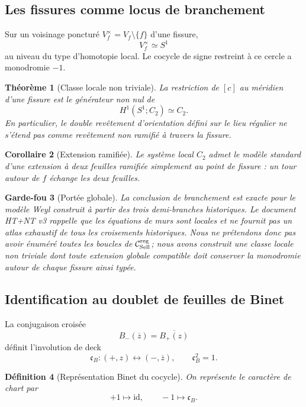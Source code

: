 \documentclass[11pt,a4paper]{article}
\newtheorem{theorem}{Théorème}[section]
\newtheorem{corollary}[theorem]{Corollaire}
\newtheorem{definition}[theorem]{Définition}
\newtheorem{guardrail}[theorem]{Garde-fou}
\begin{document}
\subsection{Les fissures comme locus de branchement}

Sur un voisinage poncturé $V_f^\times=V_f\setminus\{f\}$ d'une fissure,
\[
 V_f^\times\simeq S^1
\]
au niveau du type d'homotopie local. Le cocycle de signe restreint à ce cercle a monodromie $-1$.

\begin{theorem}[Classe locale non triviale]\label{thm:v16-local-H1}
La restriction de $[c]$ au méridien d'une fissure est le générateur non nul de
\[
 H^1(S^1;C_2)\simeq C_2.
\]
En particulier, le double revêtement d'orientation défini sur le lieu régulier ne s'étend pas comme revêtement non ramifié à travers la fissure.
\end{theorem}

\begin{corollary}[Extension ramifiée]\label{cor:v16-branched-cover}
Le système local $C_2$ admet le modèle standard d'une extension à deux feuilles ramifiée simplement au point de fissure : un tour autour de $f$ échange les deux feuilles.
\end{corollary}

\begin{guardrail}[Portée globale]
La conclusion de branchement est exacte pour le modèle Weyl construit à partir des trois demi-branches historiques. Le document HT+NT v3 rappelle que les équations de murs sont locales et ne fournit pas un atlas exhaustif de tous les croisements historiques. Nous ne prétendons donc pas avoir énuméré toutes les boucles de $\mathcal C_{\rm Sell}^{\rm reg}$; nous avons construit une classe locale non triviale dont toute extension globale compatible doit conserver la monodromie autour de chaque fissure ainsi typée.
\end{guardrail}

\subsection{Identification au doublet de feuilles de Binet}

La conjugaison croisée
\[
 B_-(\overline z)=\overline{B_+(z)}
\]
définit l'involution de deck
\[
 \mathfrak c_B:(+,z)\leftrightarrow(-,\overline z),
 \qquad
 \mathfrak c_B^2=1.
\]

\begin{definition}[Représentation Binet du cocycle]\label{def:v16-Binet-rep}
On représente le caractère de chart par
\[
 +1\longmapsto\mathrm{id},
 \qquad
 -1\longmapsto\mathfrak c_B.
\]
\end{definition}
\end{document}
